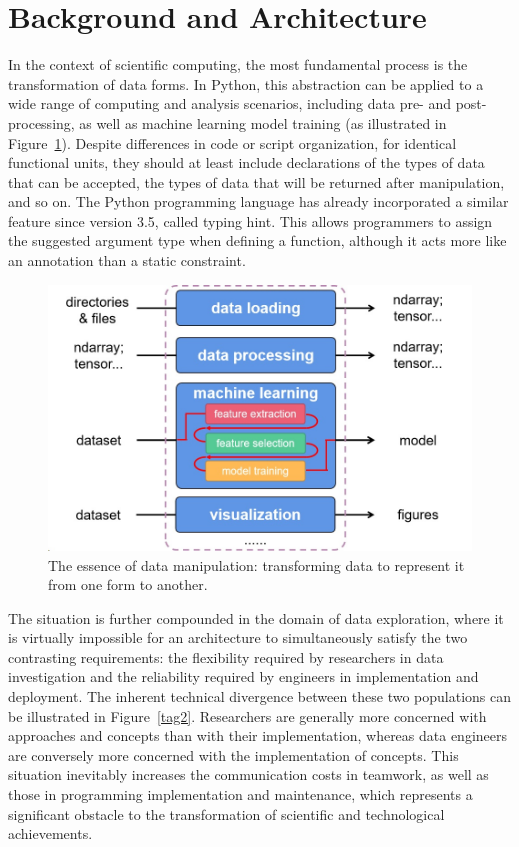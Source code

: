 \documentclass[a4paper,12pt]{article}
\newcommand{\myfig}[1]{{\color{black}Figure~\ref{#1}}}
\newcommand{\mycite}[1]{{\color{black}\cite{#1}}}
\begin{document}
\section*{Background and Architecture}

In the context of scientific computing, the most fundamental process is the transformation of data forms. In Python, this abstraction can be applied to a wide range of computing and analysis scenarios, including data pre- and post-processing, as well as machine learning model training (as illustrated in \myfig{tag1}). Despite differences in code or script organization, for identical functional units, they should at least include declarations of the types of data that can be accepted, the types of data that will be returned after manipulation, and so on. The Python programming language has already incorporated a similar feature since version 3.5, called typing hint\mycite{pep484}. This allows programmers to assign the suggested argument type when defining a function, although it acts more like an annotation than a static constraint.

\begin{figure}[htbp]
  \centering
  \includegraphics[scale=0.55]{operations.jpg}
  \caption{The essence of data manipulation: transforming data to represent it from one form to another.}
  \label{tag1}
\end{figure}

The situation is further compounded in the domain of data exploration, where it is virtually impossible for an architecture to simultaneously satisfy the two contrasting requirements: the flexibility required by researchers in data investigation and the reliability required by engineers in implementation and deployment. The inherent technical divergence between these two populations can be illustrated in \myfig{tag2}. Researchers are generally more concerned with approaches and concepts than with their implementation, whereas data engineers are conversely more concerned with the implementation of concepts. This situation inevitably increases the communication costs in teamwork, as well as those in programming implementation and maintenance, which represents a significant obstacle to the transformation of scientific and technological achievements.\par
\end{document}
